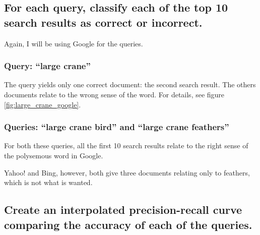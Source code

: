 \documentclass[11pt,a4paper]{article}
\begin{document}

    \subsection{For each query, classify each of the top 10 search results as correct or incorrect.} %
    \label{sub:for_each_query_classify_each_of_the_top_10_search_results_as_correct_or_incorrect_}

      Again, I will be using Google for the queries.

      \subsubsection{Query: ``large crane''} %
      \label{ssub:query_large_crane_}

        The query yields only one correct document: the second search result.
        The others documents relate to the wrong sense of the word.
        For details, see figure \ref{fig:large_crane_google}.


      \subsubsection{Queries: ``large crane bird'' and ``large crane feathers''} %
      \label{ssub:query_large_crane_bird_}

        For both these queries, all the first 10 search results relate to the right sense of the polysemous word in Google.

        Yahoo! and Bing, however, both give three documents relating only to feathers, which is not what is wanted.



    \subsection{Create an interpolated precision-recall curve comparing the accuracy of each of the queries.} %
    \label{sub:create_an_interpolated_precision_recall_curve_comparing_the_accuracy_of_each_of_the_queries_}
\end{document}
